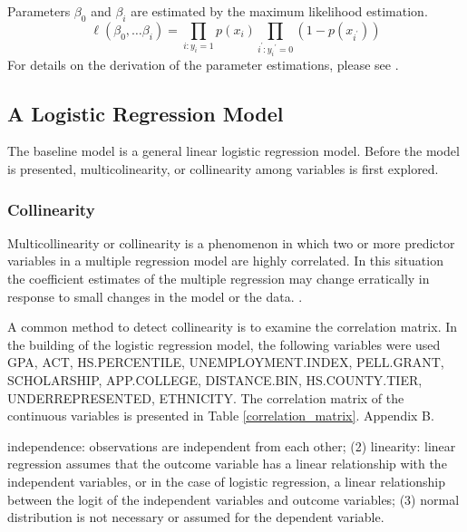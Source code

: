 \documentclass[12pt,english]{report}
\begin{document}

Parameters $\beta_0$ and $\beta_i$ are estimated by the maximum likelihood
estimation.
\begin{equation}
\ell(\beta_0,\ldots \beta_i) = \prod_{i:y_i=1} p(x_i)
\prod_{i^{'}:y_i{^{'}=0}} (1-p(x_{i^{'}}))
\end{equation}
For details on the derivation of the parameter estimations, please see
\citet{Hosmer2013}.

\subsection{A Logistic Regression Model}

The baseline model is a general linear logistic regression model.  Before the
model is presented, multicolinearity, or collinearity among variables is first
explored.

\subsubsection{Collinearity }

Multicollinearity or collinearity is a phenomenon in which two or more
predictor variables in a multiple regression model are highly correlated. In
this situation the coefficient estimates of the multiple regression may change
erratically in response to small changes in the model or the data.
\citep{belsley2005regression,Midi2010}.

A common method to detect collinearity is to examine the correlation matrix.
In the building of the logistic regression model, the following variables were
used GPA, ACT, HS.PERCENTILE, UNEMPLOYMENT.INDEX, PELL.GRANT, SCHOLARSHIP,
APP.COLLEGE, DISTANCE.BIN, HS.COUNTY.TIER, UNDERREPRESENTED, ETHNICITY.  The
correlation matrix  of the continuous variables is presented in Table
\ref{correlation_matrix}. %
Appendix B.  

independence: observations are independent from each other; (2) linearity:
linear regression assumes that the outcome variable has a linear relationship
with the independent variables, or in the case of logistic regression, a linear
relationship between the logit of the independent variables and outcome
variables; (3) normal distribution is not necessary or assumed for the
dependent variable.
\end{document}

